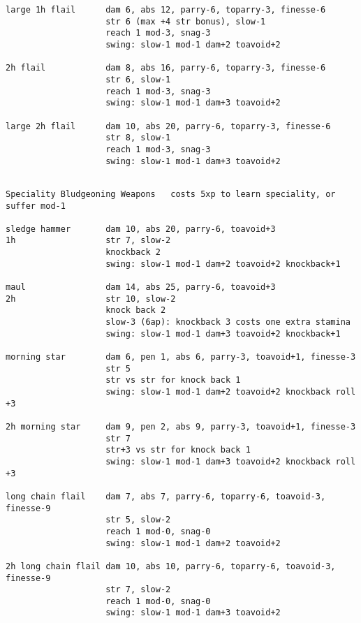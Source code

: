 \begin{verbatim}
large 1h flail      dam 6, abs 12, parry-6, toparry-3, finesse-6
                    str 6 (max +4 str bonus), slow-1
                    reach 1 mod-3, snag-3
                    swing: slow-1 mod-1 dam+2 toavoid+2

2h flail            dam 8, abs 16, parry-6, toparry-3, finesse-6
                    str 6, slow-1
                    reach 1 mod-3, snag-3
                    swing: slow-1 mod-1 dam+3 toavoid+2

large 2h flail      dam 10, abs 20, parry-6, toparry-3, finesse-6
                    str 8, slow-1
                    reach 1 mod-3, snag-3
                    swing: slow-1 mod-1 dam+3 toavoid+2


\end{verbatim} \goodbreak \begin{verbatim}
Speciality Bludgeoning Weapons   costs 5xp to learn speciality, or suffer mod-1

sledge hammer       dam 10, abs 20, parry-6, toavoid+3
1h                  str 7, slow-2
                    knockback 2
                    swing: slow-1 mod-1 dam+2 toavoid+2 knockback+1

maul                dam 14, abs 25, parry-6, toavoid+3
2h                  str 10, slow-2
                    knock back 2
                    slow-3 (6ap): knockback 3 costs one extra stamina
                    swing: slow-1 mod-1 dam+3 toavoid+2 knockback+1

morning star        dam 6, pen 1, abs 6, parry-3, toavoid+1, finesse-3
                    str 5
                    str vs str for knock back 1
                    swing: slow-1 mod-1 dam+2 toavoid+2 knockback roll +3

2h morning star     dam 9, pen 2, abs 9, parry-3, toavoid+1, finesse-3
                    str 7
                    str+3 vs str for knock back 1
                    swing: slow-1 mod-1 dam+3 toavoid+2 knockback roll +3

long chain flail    dam 7, abs 7, parry-6, toparry-6, toavoid-3, finesse-9
                    str 5, slow-2
                    reach 1 mod-0, snag-0
                    swing: slow-1 mod-1 dam+2 toavoid+2

2h long chain flail dam 10, abs 10, parry-6, toparry-6, toavoid-3, finesse-9
                    str 7, slow-2
                    reach 1 mod-0, snag-0
                    swing: slow-1 mod-1 dam+3 toavoid+2

\end{verbatim}
\normalsize






